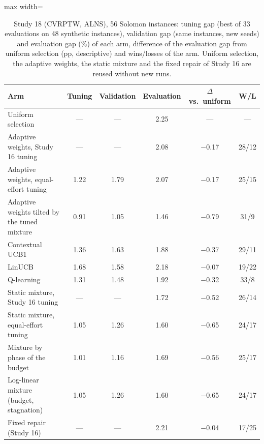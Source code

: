 \begin{table}[t]
\caption{Study 18 (CVRPTW, ALNS), 56 Solomon instances: tuning gap (best of 33 evaluations on 48 synthetic instances), validation gap (same instances, new seeds) and evaluation gap (\%) of each arm, difference of the evaluation gap from uniform selection (pp, descriptive) and wins/losses of the arm. Uniform selection, the adaptive weights, the static mixture and the fixed repair of Study 16 are reused without new runs.}\label{tab:s18a}
\centering
\small
\begin{adjustbox}{max width=\linewidth}
\begin{tabular}{lccccc}
\toprule
Arm & Tuning & Validation & Evaluation & $\Delta$ vs.\ uniform & W/L \\
\midrule
Uniform selection & --- & --- & 2.25 & --- & --- \\
Adaptive weights, Study 16 tuning & --- & --- & 2.08 & $-$0.17 & 28/12 \\
Adaptive weights, equal-effort tuning & 1.22 & 1.79 & 2.07 & $-$0.17 & 25/15 \\
Adaptive weights tilted by the tuned mixture & 0.91 & 1.05 & 1.46 & $-$0.79 & 31/9 \\
Contextual UCB1 & 1.36 & 1.63 & 1.88 & $-$0.37 & 29/11 \\
LinUCB & 1.68 & 1.58 & 2.18 & $-$0.07 & 19/22 \\
Q-learning & 1.31 & 1.48 & 1.92 & $-$0.32 & 33/8 \\
Static mixture, Study 16 tuning & --- & --- & 1.72 & $-$0.52 & 26/14 \\
Static mixture, equal-effort tuning & 1.05 & 1.26 & 1.60 & $-$0.65 & 24/17 \\
Mixture by phase of the budget & 1.01 & 1.16 & 1.69 & $-$0.56 & 25/17 \\
Log-linear mixture (budget, stagnation) & 1.05 & 1.26 & 1.60 & $-$0.65 & 24/17 \\
Fixed repair (Study 16) & --- & --- & 2.21 & $-$0.04 & 17/25 \\
\bottomrule
\end{tabular}
\end{adjustbox}
\end{table}
